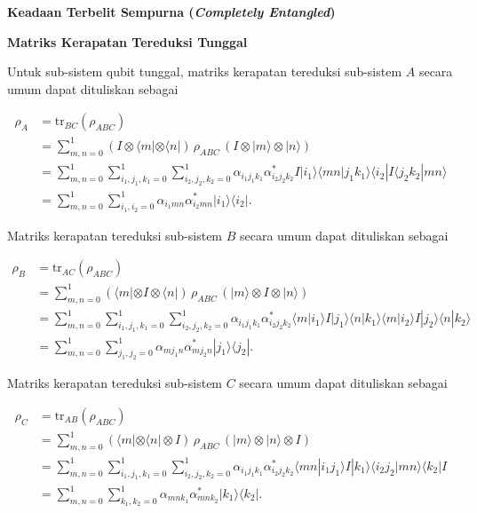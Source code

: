 \textbf{Keadaan Terbelit Sempurna (\textit{Completely Entangled})}

\textbf{Matriks Kerapatan Tereduksi Tunggal}
\par
Untuk sub-sistem qubit tunggal, matriks kerapatan tereduksi sub-sistem $A$ secara umum dapat dituliskan sebagai

\begin{align}
	\rho_A &= \mathrm{tr}_{BC}(\rho_{ABC}) \nonumber \\
	&= \sum_{m,n=0}^{1} (I \otimes \langle m| \otimes \langle n|)\, \rho_{ABC}\, (I \otimes |m\rangle \otimes |n\rangle) \nonumber \\
	&= \sum_{m,n=0}^{1} \sum_{i_1,j_1,k_1=0}^{1} \sum_{i_2,j_2,k_2=0}^{1}
	\alpha_{i_1 j_1 k_1}\alpha^{*}_{i_2 j_2 k_2}
	I |i_1\rangle \langle mn|j_1 k_1\rangle \langle i_2| I \langle j_2 k_2|mn\rangle \nonumber \\
	&= \sum_{m,n=0}^{1} \sum_{i_1,i_2=0}^{1}
	\alpha_{i_1 m n}\alpha^{*}_{i_2 m n}
	|i_1\rangle \langle i_2|\label{rhoA3qubit}.
\end{align}

Matriks kerapatan tereduksi sub-sistem $B$ secara umum dapat dituliskan sebagai

\begin{align}
	\rho_B &= \mathrm{tr}_{AC}(\rho_{ABC}) \nonumber \\
	&= \sum_{m,n=0}^{1} (\langle m| \otimes I \otimes \langle n|)\, \rho_{ABC}\, (|m\rangle \otimes I \otimes |n\rangle) \nonumber \\
	&= \sum_{m,n=0}^{1} \sum_{i_1,j_1,k_1=0}^{1} \sum_{i_2,j_2,k_2=0}^{1}
	\alpha_{i_1 j_1 k_1}\alpha^{*}_{i_2 j_2 k_2}
	\langle m|i_1\rangle I |j_1\rangle \langle n|k_1\rangle
	\langle m|i_2\rangle I |j_2\rangle \langle n|k_2\rangle \nonumber \\
	&= \sum_{m,n=0}^{1} \sum_{j_1,j_2=0}^{1}
	\alpha_{m j_1 n}\alpha^{*}_{m j_2 n}
	|j_1\rangle \langle j_2|\label{rhoB3qubit}.
\end{align}

Matriks kerapatan tereduksi sub-sistem $C$ secara umum dapat dituliskan sebagai

\begin{align}
	\rho_C &= \mathrm{tr}_{AB}(\rho_{ABC}) \nonumber \\
	&= \sum_{m,n=0}^{1} (\langle m| \otimes \langle n| \otimes I)\, \rho_{ABC}\, (|m\rangle \otimes |n\rangle \otimes I) \nonumber \\
	&= \sum_{m,n=0}^{1} \sum_{i_1,j_1,k_1=0}^{1} \sum_{i_2,j_2,k_2=0}^{1}
	\alpha_{i_1 j_1 k_1}\alpha^{*}_{i_2 j_2 k_2}
	\langle mn|i_1 j_1\rangle I |k_1\rangle
	\langle i_2 j_2|mn\rangle \langle k_2| I \nonumber \\
	&= \sum_{m,n=0}^{1} \sum_{k_1,k_2=0}^{1}
	\alpha_{m n k_1}\alpha^{*}_{m n k_2}
	|k_1\rangle \langle k_2|\label{rhoC3qubit}.
\end{align}

